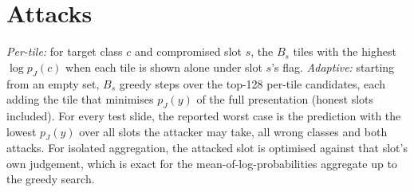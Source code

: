 \documentclass[runningheads]{llncs}
\begin{document}
\section{Attacks}
\emph{Per-tile:} for target class $c$ and compromised slot $s$, the $B_s$ tiles with the highest $\log p_J(c)$ when each tile is shown alone under slot $s$'s flag. \emph{Adaptive:} starting from an empty set, $B_s$ greedy steps over the top-128 per-tile candidates, each adding the tile that minimises $p_J(y)$ of the full presentation (honest slots included). For every test slide, the reported worst case is the prediction with the lowest $p_J(y)$ over all slots the attacker may take, all wrong classes and both attacks. For isolated aggregation, the attacked slot is optimised against that slot's own judgement, which is exact for the mean-of-log-probabilities aggregate up to the greedy search.
\end{document}
